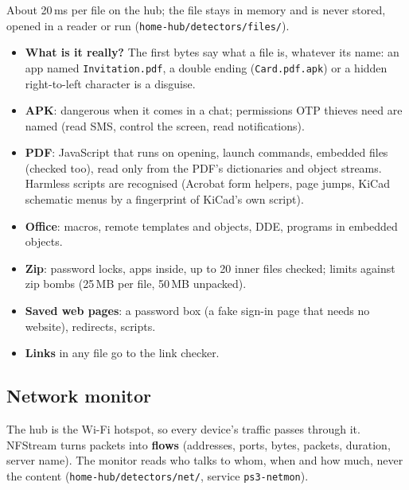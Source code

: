 \documentclass[11pt,a4paper]{article}
\newcommand{\code}[1]{\texttt{#1}}
\begin{document}
About 20\,ms per file on the hub; the file stays in memory and is never stored, opened in a reader or run
(\code{home-hub/detectors/files/}).
\begin{itemize}
  \item \textbf{What is it really?} The first bytes say what a file is, whatever its name: an app named
        \code{Invitation.pdf}, a double ending (\code{Card.pdf.apk}) or a hidden right-to-left character is a disguise.
  \item \textbf{APK}: dangerous when it comes in a chat; permissions OTP thieves need are named (read SMS, control
        the screen, read notifications).
  \item \textbf{PDF}: JavaScript that runs on opening, launch commands, embedded files (checked too), read only from
        the PDF's dictionaries and object streams. Harmless scripts are recognised (Acrobat form helpers, page jumps,
        KiCad schematic menus by a fingerprint of KiCad's own script).
  \item \textbf{Office}: macros, remote templates and objects, DDE, programs in embedded objects.
  \item \textbf{Zip}: password locks, apps inside, up to 20 inner files checked; limits against zip bombs
        (25\,MB per file, 50\,MB unpacked).
  \item \textbf{Saved web pages}: a password box (a fake sign-in page that needs no website), redirects, scripts.
  \item \textbf{Links} in any file go to the link checker.
\end{itemize}

\subsection{Network monitor}
\label{sec:net}

The hub is the Wi-Fi hotspot, so every device's traffic passes through it. NFStream turns packets into
\textbf{flows} (addresses, ports, bytes, packets, duration, server name). The monitor reads who talks to whom, when
and how much, never the content (\code{home-hub/detectors/net/}, service \code{ps3-netmon}).
\end{document}
